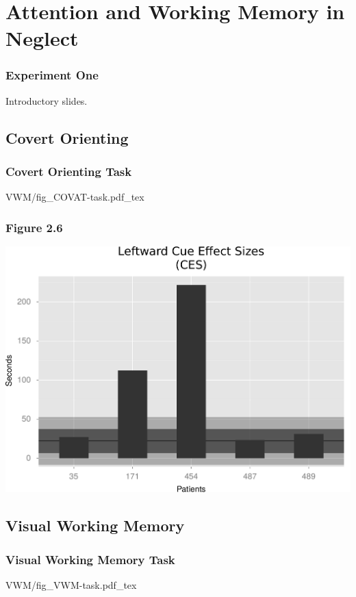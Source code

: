 \documentclass{beamer}
\begin{document}


\section[Attention and WM]{Attention and Working Memory in Neglect}

\begin{frame}
	\frametitle{Experiment One}
	Introductory slides.
\end{frame}


\subsection*{Covert Orienting}
\begin{frame}
	\frametitle{Covert Orienting Task}
	\def\svgwidth{\textwidth}
	{VWM/fig_COVAT-task.pdf_tex}
\end{frame}


\subsection*{Visual Working Memory}

\begin{frame}
	\frametitle{Visual Working Memory Task}
	\def\svgwidth{\textwidth}
	{VWM/fig_VWM-task.pdf_tex}
\end{frame}
\end{document}
